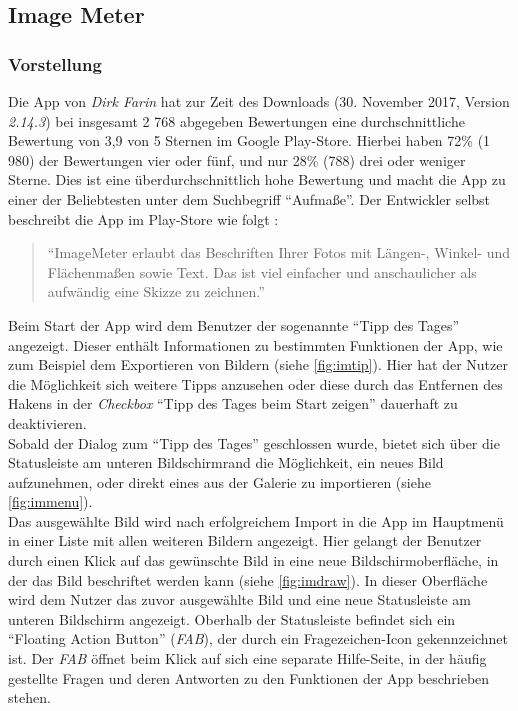 \subsection{Image Meter}
\subsubsection{Vorstellung}
Die App \im{} von \emph{Dirk Farin} hat zur Zeit des Downloads (30. November 2017, Version \emph{2.14.3}) bei insgesamt 2 768 abgegeben Bewertungen eine durchschnittliche Bewertung von 3,9 von 5 Sternen im Google Play-Store.
Hierbei haben 72\% (1 980) der Bewertungen vier oder fünf, und nur 28\% (788) drei oder weniger Sterne.
Dies ist eine überdurchschnittlich hohe Bewertung und macht die App zu einer der Beliebtesten unter dem Suchbegriff ``Aufmaße''.
Der Entwickler selbst beschreibt die App im Play-Store wie folgt \citep{FarinIM}:

\begin{quote}
  ``ImageMeter erlaubt das Beschriften Ihrer Fotos mit Längen-, Winkel- und Flächenmaßen sowie Text.
  Das ist viel einfacher und anschaulicher als aufwändig eine Skizze zu zeichnen.''
\end{quote}

Beim Start der App wird dem Benutzer der sogenannte ``Tipp des Tages'' angezeigt.
Dieser enthält Informationen zu bestimmten Funktionen der App, wie zum Beispiel dem Exportieren von Bildern (siehe \autoref{fig:imtip}).
Hier hat der Nutzer die Möglichkeit sich weitere Tipps anzusehen oder diese durch das Entfernen des Hakens in der \emph{Checkbox} ``Tipp des Tages beim Start zeigen'' dauerhaft zu deaktivieren. \\

Sobald der Dialog zum ``Tipp des Tages'' geschlossen wurde, bietet sich über die Statusleiste am unteren Bildschirmrand die Möglichkeit, ein neues Bild aufzunehmen, oder direkt eines aus der Galerie zu importieren (siehe \autoref{fig:immenu}). \\

Das ausgewählte Bild wird nach erfolgreichem Import in die App im Hauptmenü in einer Liste mit allen weiteren Bildern angezeigt.
Hier gelangt der Benutzer durch einen Klick auf das gewünschte Bild in eine neue Bildschirmoberfläche, in der das Bild beschriftet werden kann (siehe \autoref{fig:imdraw}).
In dieser Oberfläche wird dem Nutzer das zuvor ausgewählte Bild und eine neue Statusleiste am unteren Bildschirm angezeigt.
Oberhalb der Statusleiste befindet sich ein ``Floating Action Button'' (\emph{FAB}), der durch ein Fragezeichen-Icon gekennzeichnet ist.
Der \emph{FAB} öffnet beim Klick auf sich eine separate Hilfe-Seite, in der häufig gestellte Fragen und deren Antworten zu den Funktionen der App beschrieben stehen. \\

